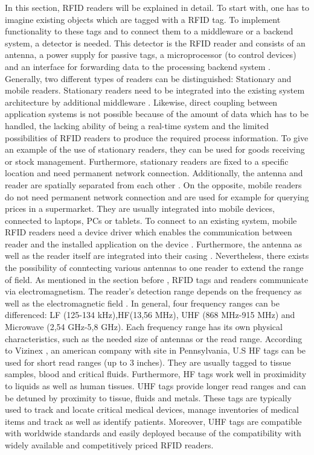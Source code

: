 In this section, RFID readers will be explained in detail. To start with, one has to imagine existing objects which are tagged with a RFID tag. To implement functionality to these tags and to connect them to a middleware or a backend system, a detector is needed. This detector is the RFID reader and consists of an antenna, a power supply for passive tags, a microprocessor (to control devices) and an interface for forwarding data to the processing backend system \cite{henrici}. 
Generally, two different types of readers can be distinguished: Stationary and mobile readers. Stationary readers need to be integrated into the existing system architecture by additional middleware \cite[p.133 ff.]{mobile}. Likewise, direct coupling between application systems is not possible because of the amount of data which has to be handled, the lacking ability of being a real-time system and the limited possibilities of RFID readers to produce the required process information. To give an example of the use of stationary readers, they can be used for goods receiving or stock management. Furthermore, stationary readers are fixed to a specific location and need permanent network connection. Additionally, the antenna and reader are spatially separated from each other \cite[p.17 ff.]{fokus}.
On the opposite, mobile readers do not need permanent network connection and are used for example for querying prices in a supermarket. They are usually integrated into mobile devices, connected to laptops, \ac{PC}s or tablets. To connect to an existing system, mobile RFID readers need a device driver which enables the communication between reader and the installed application on the device \cite[p.133 ff.]{mobile}. Furthermore, the antenna as well as the reader itself are integrated into their casing \cite[p.17 ff.]{fokus}.
Nevertheless, there exists the possibility of conntecting various antennas to one reader to extend the range of field.
As mentioned in the section before \pageref{tags}, RFID tags and readers communicate via electromagnetism. The reader's detection range depends on the frequency as well as the electromagnetic field \cite{henrici}. In general, four frequency ranges can be differenced: \ac{LF} (125-134 kHz),\ac{HF}(13,56 MHz), \ac{UHF} (868 MHz-915 MHz) and Microwave (2,54 GHz-5,8 GHz). Each frequency range has its own physical characteristics, such as the needed size of antennas or the read range.
According to Vizinex \cite{vizinex}, an american company with site in Pennsylvania, U.S HF tags can be used for short read ranges (up to 3 inches). They are usually tagged to tissue samples, blood and critical fluids. Furthermore, HF tags work well in proximidity to liquids as well as human tissues. UHF tags provide longer read ranges and can be detuned by proximity to tissue, fluids and metals. These tags are typically used to track and locate critical medical devices, manage inventories of medical items and track as well as identify patients. Moreover, UHF tags are compatible with worldwide standards and easily deployed because of the compatibility with widely available and competitively priced RFID readers.
